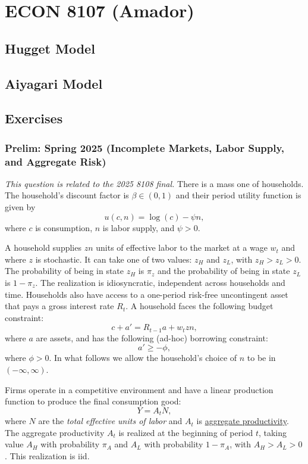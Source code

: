 \documentclass[11pt,english]{article}
\begin{document}
\section{ECON 8107 (Amador)}

\subsection{Hugget Model}

\subsection{Aiyagari Model}

\subsection{Exercises}

\subsubsection{Prelim: Spring 2025 (Incomplete Markets, Labor Supply, and Aggregate Risk)}
\textit{This question is related to the 2025 8108 final.} There is a mass one
of households. The household's discount factor is $\beta \in (0,1)$ and their
period utility function is given by
\[
  u(c, n) = \log(c) - \psi n,
\]
where $c$ is consumption, $n$ is labor supply, and $\psi > 0$.
 
A household supplies $zn$ units of effective labor to the market at a wage
$w_t$ and where $z$ is stochastic. It can take one of two values: $z_H$ and
$z_L$, with $z_H > z_L > 0$. The probability of being in state $z_H$ is
$\pi_z$ and the probability of being in state $z_L$ is $1 - \pi_z$. The
realization is idiosyncratic, independent across households and time.
Households also have access to a one-period risk-free uncontingent asset that
pays a gross interest rate $R_t$. A household faces the following budget
constraint:
\[
  c + a' = R_{t-1} a + w_t z n,
\]
where $a$ are assets, and has the following (ad-hoc) borrowing constraint:
\[
  a' \geq -\phi,
\]
where $\phi > 0$. In what follows we allow the household's choice of $n$ to
be in $(-\infty, \infty)$.
 
Firms operate in a competitive environment and have a linear production
function to produce the final consumption good:
\[
  Y = A_t N,
\]
where $N$ are the \emph{total effective units of labor} and $A_t$ is
\underline{aggregate productivity}. The aggregate productivity $A_t$ is
realized at the beginning of period $t$, taking value $A_H$ with probability
$\pi_A$ and $A_L$ with probability $1 - \pi_A$, with $A_H > A_L > 0$. This
realization is iid.
 
\end{document}
